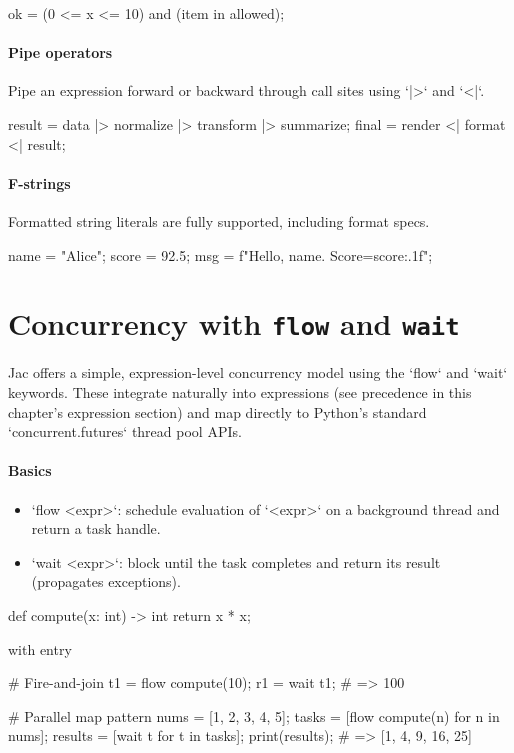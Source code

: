 \begin{jacblock}
ok = (0 <= x <= 10) and (item in allowed);
\end{jacblock}

\paragraph{Pipe operators}

Pipe an expression forward or backward through call sites using `|>` and `<|`.

\begin{jacblock}
result = data |> normalize |> transform |> summarize;
final  = render <| format <| result;
\end{jacblock}

\paragraph{F-strings}

Formatted string literals are fully supported, including format specs.

\begin{jacblock}
name = "Alice"; score = 92.5;
msg = f"Hello, {name}. Score={score:.1f}";
\end{jacblock}

\section{Concurrency with \texttt{flow} and \texttt{wait}}

Jac offers a simple, expression-level concurrency model using the `flow` and `wait` keywords. These integrate naturally into expressions (see precedence in this chapter’s expression section) and map directly to Python’s standard `concurrent.futures` thread pool APIs.

\paragraph{Basics}

\begin{itemize}
    \item `flow <expr>`: schedule evaluation of `<expr>` on a background thread and return a task handle.
    \item `wait <expr>`: block until the task completes and return its result (propagates exceptions).
\end{itemize}

\begin{jacblock}
def compute(x: int) -> int { return x * x; }

with entry {
    # Fire-and-join
    t1 = flow compute(10);
    r1 = wait t1;          # => 100

    # Parallel map pattern
    nums   = [1, 2, 3, 4, 5];
    tasks  = [flow compute(n) for n in nums];
    results = [wait t for t in tasks];
    print(results);        # => [1, 4, 9, 16, 25]
}
\end{jacblock}

